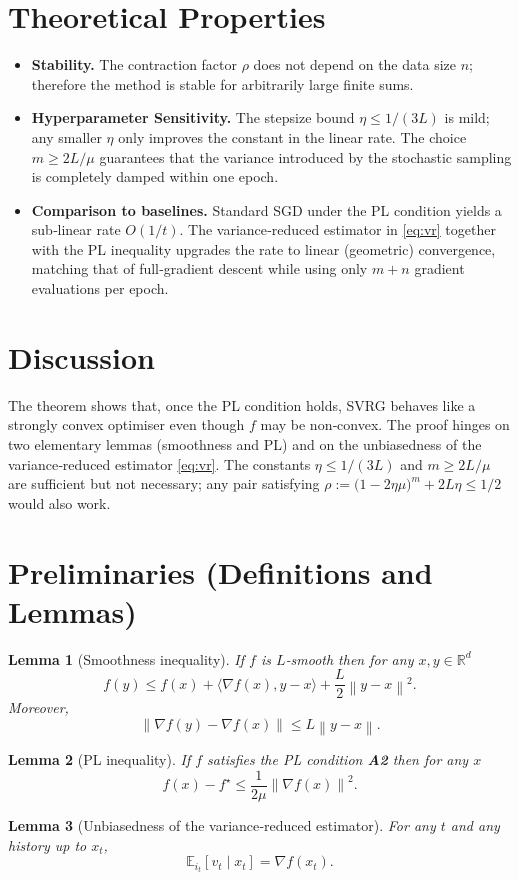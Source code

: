 \documentclass{article}
\newtheorem{lemma}{Lemma}
\newcommand{\E}{\mathbb{E}}
\newcommand{\R}{\mathbb{R}}
\newcommand{\norm}[1]{\left\|#1\right\|}
\newcommand{\inner}[2]{\langle #1,#2\rangle}
\newcommand{\grad}{\nabla}
\begin{document}
\section*{Theoretical Properties}
\begin{itemize}[leftmargin=*]
\item \textbf{Stability.} The contraction factor $\rho$ does not depend on the data size $n$; therefore the method is stable for arbitrarily large finite sums.
\item \textbf{Hyperparameter Sensitivity.} The stepsize bound $\eta\le 1/(3L)$ is mild; any smaller $\eta$ only improves the constant in the linear rate. The choice $m\ge 2L/\mu$ guarantees that the variance introduced by the stochastic sampling is completely damped within one epoch.
\item \textbf{Comparison to baselines.} Standard SGD under the PL condition yields a sub‑linear rate $O(1/t)$. The variance‑reduced estimator in \eqref{eq:vr} together with the PL inequality upgrades the rate to linear (geometric) convergence, matching that of full‑gradient descent while using only $m+n$ gradient evaluations per epoch.
\end{itemize}

\section*{Discussion}
The theorem shows that, once the PL condition holds, SVRG behaves like a strongly convex optimiser even though $f$ may be non‑convex. The proof hinges on two elementary lemmas (smoothness and PL) and on the unbiasedness of the variance‑reduced estimator \eqref{eq:vr}. The constants $\eta\le 1/(3L)$ and $m\ge 2L/\mu$ are sufficient but not necessary; any pair satisfying 
$\rho:=\bigl(1-2\eta\mu\bigr)^{m}+2L\eta\le 1/2$ would also work.

\newpage

\section*{Preliminaries (Definitions and Lemmas)}
\begin{lemma}[Smoothness inequality]\label{lem:smooth}
If $f$ is $L$‑smooth then for any $x,y\in\R^{d}$
\[
f(y)\le f(x)+\inner{\grad f(x)}{y-x}+\frac{L}{2}\norm{y-x}^{2}.
\tag{L1}
\]
Moreover,
\[
\norm{\grad f(y)-\grad f(x)}\le L\norm{y-x}.
\tag{L2}
\]
\end{lemma}
\begin{lemma}[PL inequality]\label{lem:pl}
If $f$ satisfies the PL condition \textbf{A2} then for any $x$
\[
f(x)-f^{\star}\le \frac{1}{2\mu}\norm{\grad f(x)}^{2}.
\tag{L3}
\]
\end{lemma}
\begin{lemma}[Unbiasedness of the variance‑reduced estimator]\label{lem:unbiased}
For any $t$ and any history up to $x_t$,
\[
\E_{i_t}\!\left[ v_t \mid x_t\right]=\grad f(x_t).
\tag{L4}
\]
\end{lemma}
\end{document}
